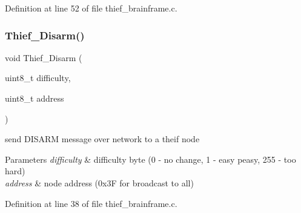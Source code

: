 Definition at line 52 of file thief\+\_\+brainframe.\+c.

\mbox{\label{group__thief__brainframe_ga10cdfb092b86745f7fb0b3531e0436ab}} 
\subsubsection{\texorpdfstring{Thief\_Disarm()}{Thief\_Disarm()}}
{\footnotesize\ttfamily void Thief\+\_\+\+Disarm (\begin{DoxyParamCaption}\item[{uint8\+\_\+t}]{difficulty,  }\item[{uint8\+\_\+t}]{address }\end{DoxyParamCaption})}



send D\+I\+S\+A\+RM message over network to a theif node 


\begin{DoxyParams}{Parameters}
{\em difficulty} & difficulty byte (0 -\/ no change, 1 -\/ easy peasy, 255 -\/ too hard) \\
\hline
{\em address} & node address (0x3F for broadcast to all) \\
\hline
\end{DoxyParams}


Definition at line 38 of file thief\+\_\+brainframe.\+c.

